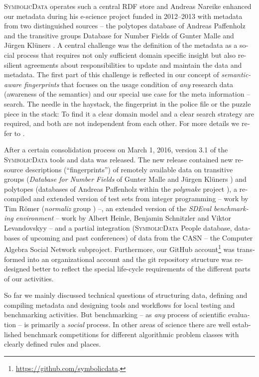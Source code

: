 \documentclass[11pt]{article}
\def\SD{\textsc{SymbolicData}}
\begin{document}
\begin{otherlanguage}{english}
\begin{multicols}{2}
{\SD} operates such a central RDF store \cite{sdstore} and Andreas Nareike
enhanced our metadata during his e-science project funded in 2012--2013 with
metadata from two distinguished sources -- the polytopes database of Andreas
Paffenholz \cite{Paffenholz} and the transitive groups Database for Number
Fields of Gunter Malle and J\"urgen Kl\"uners \cite{MalleKlueners}.  A central
challenge was the definition of the metadata as a social process that requires
not only sufficient domain specific insight but also resilient agreements about
responsibilities to update and maintain the data and metadata.  The first part
of this challenge is reflected in our concept of \emph{semantic-aware
  fingerprints} that focuses on the usage condition of \emph{any} research data
(awareness of the semantics) and our special use case for the meta information
-- search. The needle in the haystack, the fingerprint in the police file or
the puzzle piece in the stack: To find it a clear domain model and a clear
search strategy are required, and both are not independent from each other.
For more details we refer to \cite{icms-16}.

After a certain consolidation process on March 1, 2016, version 3.1 of the
{\SD} tools and data was released. The new release contained new resource
descriptions (``fingerprints'') of remotely available data on transitive groups
(\emph{Database for Number Fields} of Gunter Malle and J\"urgen Kl\"uners
\cite{MalleKlueners}) and polytopes (databases of Andreas Paffenholz
\cite{Paffenholz} within the \emph{polymake} project \cite{polymake}), a
recompiled and extended version of test sets from integer programming -- work
by Tim R\"omer (\emph{normaliz} group \cite{normaliz}) --, an extended version
of the \emph{SDEval benchmarking environment} -- work by Albert Heinle,
Benjamin Schnitzler and Viktor Levandovskyy \cite{heinle-15} -- and a partial
integration ({\SD} People database, databases of upcoming and past conferences)
of data from the CASN -- the Computer Algebra Social Network subproject.
Furthermore, our GitHub
account\footnote{\url{https://github.com/symbolicdata}.} was transformed into
an organizational account and the git repository structure was redesigned
better to reflect the special life-cycle requirements of the different parts of
our activities.


So far we mainly discussed technical questions of structuring data, defining
and compiling metadata and designing tools and workflows for local testing and
benchmarking activities.  But benchmarking -- as \emph{any} process of
scientific evaluation -- is primarily a \emph{social} process.  In other areas
of science there are well established benchmark competitions for different
algorithmic problem classes with clearly defined rules and places.


\end{multicols}
\end{otherlanguage}
\end{document}
